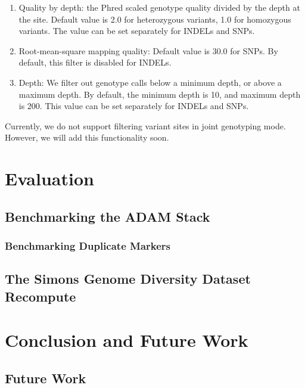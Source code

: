 \documentclass[phd]{ucbthesis}
\begin{document}
\begin{enumerate}
\item Quality by depth: the Phred scaled genotype quality divided by the depth at
the site. Default value is 2.0 for heterozygous variants, 1.0 for homozygous
variants. The value can be set separately for INDELs and SNPs.
\item Root-mean-square mapping quality: Default value is 30.0 for SNPs. By default,
this filter is disabled for INDELs.
\item Depth: We filter out genotype calls below a minimum depth, or above a maximum
depth. By default, the minimum depth is 10, and maximum depth is 200. This value
can be set separately for INDELs and SNPs.
\end{enumerate}

Currently, we do not support filtering variant sites in joint genotyping mode.
However, we will add this functionality soon.

\part{Evaluation}

\chapter{Benchmarking the \textsc{ADAM} Stack}
\label{chap:benchmarking}

\section{Benchmarking Duplicate Markers}
\label{sec:benchmarking-duplicate-markers}

\chapter{The Simons Genome Diversity Dataset Recompute}
\label{chap:sgdd}

\part{Conclusion and Future Work}

\chapter{Future Work}
\label{chap:future-work}
\end{document}
